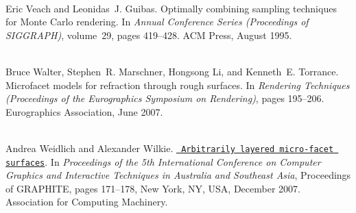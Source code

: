 \begin{DoxyDescription}
\item[\label{citelist_CITEREF_Veach:1995:Optimally}%
\Hypertarget{citelist_CITEREF_Veach:1995:Optimally}%
\mbox{[}19\mbox{]}]\hfill \\
Eric Veach and Leonidas~J. Guibas. Optimally combining sampling techniques for Monte Carlo rendering. In {\itshape Annual Conference Series (Proceedings of SIGGRAPH)}, volume~29, pages 419--428. ACM Press, August 1995. 


\item[\label{citelist_CITEREF_Walter:2007:Microfacet}%
\Hypertarget{citelist_CITEREF_Walter:2007:Microfacet}%
\mbox{[}20\mbox{]}]\hfill \\
Bruce Walter, Stephen~R. Marschner, Hongsong Li, and Kenneth~E. Torrance. Microfacet models for refraction through rough surfaces. In {\itshape Rendering Techniques (Proceedings of the Eurographics Symposium on Rendering)}, pages 195--206. Eurographics Association, June 2007. 


\item[\label{citelist_CITEREF_Weidlich:2007:Arbitrarily}%
\Hypertarget{citelist_CITEREF_Weidlich:2007:Arbitrarily}%
\mbox{[}21\mbox{]}]\hfill \\
Andrea Weidlich and Alexander Wilkie. \href{https://doi.org/10.1145/1321261.1321292}{\texttt{ Arbitrarily layered micro-\/facet surfaces}}. In {\itshape Proceedings of the 5th International Conference on Computer Graphics and Interactive Techniques in Australia and Southeast Asia}, Proceedings of GRAPHITE, pages 171--178, New York, NY, USA, December 2007. Association for Computing Machinery. 


\end{DoxyDescription}
